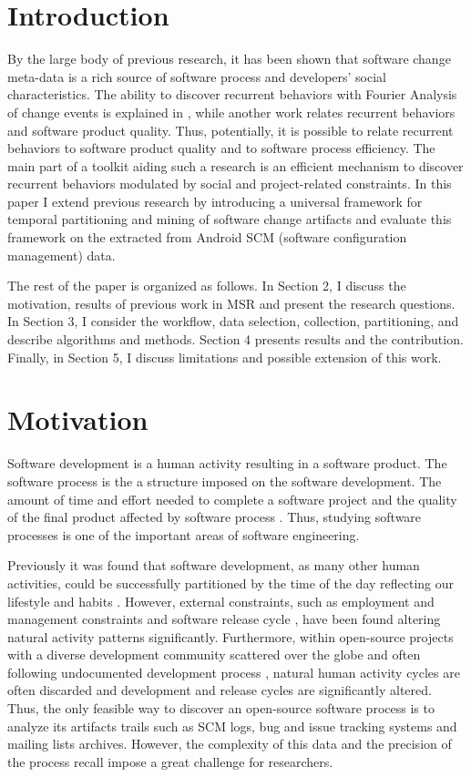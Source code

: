 \documentclass[conference]{worldcomp}
\begin{document}
\section{Introduction}
By the large body of previous research, it has been shown that software change
meta-data is a rich 
source of software process and developers' social characteristics. The ability
to discover
recurrent behaviors with Fourier Analysis of change events is 
explained in \cite{citeulike:10377345}, while another work
\cite{citeulike:10392277}
relates recurrent behaviors and software product quality. Thus, potentially,
it is possible to relate recurrent behaviors to software product 
quality and to software process efficiency. The main part of a toolkit
aiding such a research is an efficient mechanism to discover recurrent behaviors
modulated by social and project-related constraints. In this paper I extend 
previous research by introducing a universal framework for temporal 
partitioning and mining of software change artifacts and evaluate this
framework on the extracted from Android SCM (software configuration management)
data. 

The rest of the paper is organized as follows. 
In Section 2, I discuss the motivation, results of previous work in MSR and present 
the research questions. 
In Section 3, I consider the workflow, data selection, collection, partitioning, 
and describe algorithms and methods. Section 4 presents results and the contribution.
Finally, in Section 5, I discuss limitations and possible extension of this work.

\section{Motivation}
Software development is a human activity resulting in a software product. The software
process is the a structure imposed on the software development. 
The amount of time and effort needed to complete a software project and the 
quality of the final product affected by software process \cite{citeulike:9919804}.
 Thus, studying software processes is one of 
the important areas of software engineering. 

Previously it was found that software development, as many other human activities,
could be successfully partitioned by the time of the day reflecting our lifestyle and habits
\cite{citeulike:10396459} \cite{citeulike:10392305}. However, external constraints, 
such as employment and management constraints \cite{citeulike:6095797} and
software release cycle \cite{citeulike:2739216},  have been found altering 
natural activity patterns significantly. Furthermore, within open-source 
projects with a diverse development community scattered over the globe and 
often following undocumented development process \cite{citeulike:10377366}, natural human 
activity cycles are often discarded and development and release cycles are significantly altered.
Thus, the only feasible way to discover an open-source software process is to analyze 
its artifacts trails such as SCM logs, bug and issue tracking systems and 
mailing lists archives. However, the complexity of this data and the precision 
of the process recall impose a great challenge for researchers.
\end{document}
